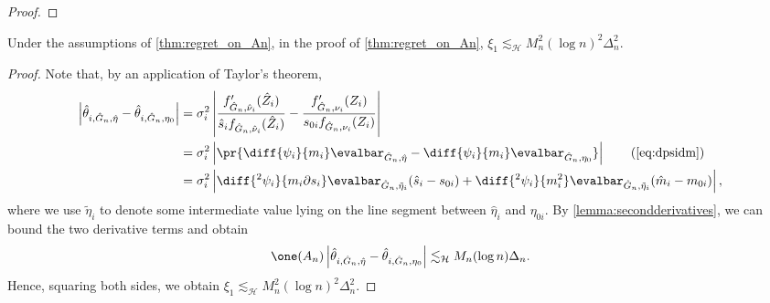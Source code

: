 \documentclass[12pt, reqno]{amsart}
\newcommand{\absauto}[1]{\left| #1 \right|}
\newcommand{\leH}{\lesssim_{\mathcal{H}}}
\newcommand{\hatm}{\hat m}
\newcommand{\hats}{\hat s}
\newcommand{\hateta}{\hat\eta}
\numberwithin{equation}{section}
\begin{document}
\begin{refsection}
\begin{appendices}
\begin{proof}
\end{proof}





\begin{lemma}
\label{sub:xi1}

Under the assumptions of \cref{thm:regret_on_An}, in the proof of \cref{thm:regret_on_An},
$\xi_1 \leH M_n^2 (\log n)^2 \Delta_n^2$.
\end{lemma}
\begin{proof}
Note that, by an application of Taylor's theorem, \begin{align*}
\absauto{
    \hat\theta_{i, \hat G_n, \hateta} - \hat\theta_{i, \hat G_n, \eta_0}
} &= \sigma_i^2  \absauto{
    \frac{f'_{\hat G_n, \hat\nu_i}(\hat Z_i)}{\hats_i f_{\hat G_n, \hat\nu_i}(\hat Z_i)} -
    \frac{f'_{\hat G_n, \nu_i}(Z_i)}{s_{0i} f_{\hat G_n, \nu_i}(Z_i)}
}  \\
&= \sigma_i^2 \absauto{\pr{\diff{\psi_i}{m_i} \evalbar_{\hat G_n, \hat\eta} -
\diff{\psi_i}{m_i} \evalbar_{\hat G_n, \eta_0}}}
\tag{\cref{eq:dpsidm}}
\\
& = \sigma_i^2 \absauto{
    \diff{^2\psi_i}{m_i \partial s_i}\evalbar_{\hat G_n, \tilde \eta_i} (\hats_i - s_{0i})
    + \diff{^2\psi_i}{m_i^2}\evalbar_{\hat G_n, \tilde \eta_i} (\hatm_i - m_{0i})
},
\end{align*}
where we use $\tilde\eta_i$ to denote some intermediate value lying on the line segment
between $\hateta_i$ and $\eta_{0i}$. By \cref{lemma:secondderivatives}, we can bound the
two derivative terms and obtain \[
\one(A_n) \absauto{
    \hat\theta_{i, \hat G_n, \hateta} - \hat\theta_{i, \hat G_n, \eta_0}
} \leH M_n (\log n) \Delta_n.
\]
Hence, squaring both sides, we obtain $
\xi_1 \leH M_n^2 (\log n)^2 \Delta_n^2.
$
\end{proof}


\begin{lemma}
\label{sub:xi4}


\end{lemma}
\end{appendices}
\end{refsection}
\end{document}
